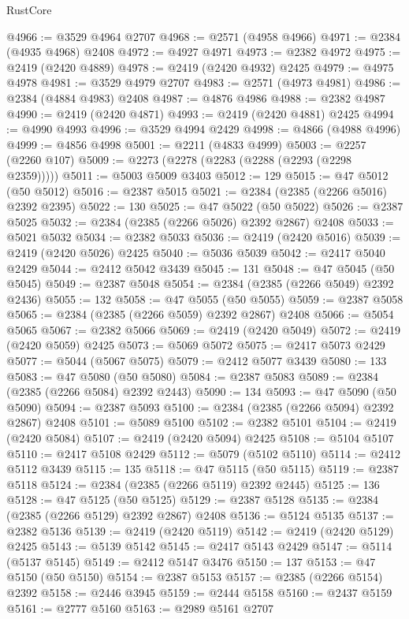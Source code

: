 \begin{lexlean}{RustCore}
\begin{coremodule}
@4966 := @3529 @4964 @2707
@4968 := @2571 (@4958 @4966)
@4971 := @2384 (@4935 @4968) @2408
@4972 := @4927 @4971
@4973 := @2382 @4972
@4975 := @2419 (@2420 @4889)
@4978 := @2419 (@2420 @4932) @2425
@4979 := @4975 @4978
@4981 := @3529 @4979 @2707
@4983 := @2571 (@4973 @4981)
@4986 := @2384 (@4884 @4983) @2408
@4987 := @4876 @4986
@4988 := @2382 @4987
@4990 := @2419 (@2420 @4871)
@4993 := @2419 (@2420 @4881) @2425
@4994 := @4990 @4993
@4996 := @3529 @4994 @2429
@4998 := @4866 (@4988 @4996)
@4999 := @4856 @4998
@5001 := @2211 (@4833 @4999)
@5003 := @2257 (@2260 @107)
@5009 := @2273 (@2278 (@2283 (@2288 (@2293 (@2298 @2359)))))
@5011 := @5003 @5009 @3403
@5012 := 129
@5015 := @47 @5012 (@50 @5012)
@5016 := @2387 @5015
@5021 := @2384 (@2385 (@2266 @5016) @2392 @2395)
@5022 := 130
@5025 := @47 @5022 (@50 @5022)
@5026 := @2387 @5025
@5032 := @2384 (@2385 (@2266 @5026) @2392 @2867) @2408
@5033 := @5021 @5032
@5034 := @2382 @5033
@5036 := @2419 (@2420 @5016)
@5039 := @2419 (@2420 @5026) @2425
@5040 := @5036 @5039
@5042 := @2417 @5040 @2429
@5044 := @2412 @5042 @3439
@5045 := 131
@5048 := @47 @5045 (@50 @5045)
@5049 := @2387 @5048
@5054 := @2384 (@2385 (@2266 @5049) @2392 @2436)
@5055 := 132
@5058 := @47 @5055 (@50 @5055)
@5059 := @2387 @5058
@5065 := @2384 (@2385 (@2266 @5059) @2392 @2867) @2408
@5066 := @5054 @5065
@5067 := @2382 @5066
@5069 := @2419 (@2420 @5049)
@5072 := @2419 (@2420 @5059) @2425
@5073 := @5069 @5072
@5075 := @2417 @5073 @2429
@5077 := @5044 (@5067 @5075)
@5079 := @2412 @5077 @3439
@5080 := 133
@5083 := @47 @5080 (@50 @5080)
@5084 := @2387 @5083
@5089 := @2384 (@2385 (@2266 @5084) @2392 @2443)
@5090 := 134
@5093 := @47 @5090 (@50 @5090)
@5094 := @2387 @5093
@5100 := @2384 (@2385 (@2266 @5094) @2392 @2867) @2408
@5101 := @5089 @5100
@5102 := @2382 @5101
@5104 := @2419 (@2420 @5084)
@5107 := @2419 (@2420 @5094) @2425
@5108 := @5104 @5107
@5110 := @2417 @5108 @2429
@5112 := @5079 (@5102 @5110)
@5114 := @2412 @5112 @3439
@5115 := 135
@5118 := @47 @5115 (@50 @5115)
@5119 := @2387 @5118
@5124 := @2384 (@2385 (@2266 @5119) @2392 @2445)
@5125 := 136
@5128 := @47 @5125 (@50 @5125)
@5129 := @2387 @5128
@5135 := @2384 (@2385 (@2266 @5129) @2392 @2867) @2408
@5136 := @5124 @5135
@5137 := @2382 @5136
@5139 := @2419 (@2420 @5119)
@5142 := @2419 (@2420 @5129) @2425
@5143 := @5139 @5142
@5145 := @2417 @5143 @2429
@5147 := @5114 (@5137 @5145)
@5149 := @2412 @5147 @3476
@5150 := 137
@5153 := @47 @5150 (@50 @5150)
@5154 := @2387 @5153
@5157 := @2385 (@2266 @5154) @2392
@5158 := @2446 @3945
@5159 := @2444 @5158
@5160 := @2437 @5159
@5161 := @2777 @5160
@5163 := @2989 @5161 @2707

\end{coremodule}
\end{lexlean}
